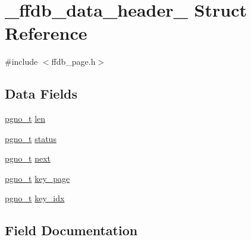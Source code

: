 \hypertarget{struct__ffdb__data__header__}{}\section{\+\_\+ffdb\+\_\+data\+\_\+header\+\_\+ Struct Reference}
\label{struct__ffdb__data__header__}


{\ttfamily \#include $<$ffdb\+\_\+page.\+h$>$}

\subsection*{Data Fields}
\begin{DoxyCompactItemize}
\item 
\mbox{\hyperlink{adat-devel_2other__libs_2filedb_2filehash_2ffdb__db_8h_a000813331643d38481142bcce7de1501}{pgno\+\_\+t}} \mbox{\hyperlink{struct__ffdb__data__header___ae92f78b964c32a66a889e0f8926f39e9}{len}}
\item 
\mbox{\hyperlink{adat-devel_2other__libs_2filedb_2filehash_2ffdb__db_8h_a000813331643d38481142bcce7de1501}{pgno\+\_\+t}} \mbox{\hyperlink{struct__ffdb__data__header___a4c2b44b141df921e83933b19b1fd4e44}{status}}
\item 
\mbox{\hyperlink{adat-devel_2other__libs_2filedb_2filehash_2ffdb__db_8h_a000813331643d38481142bcce7de1501}{pgno\+\_\+t}} \mbox{\hyperlink{struct__ffdb__data__header___a6eec9d909ab0bdaa5d2290d815f9f90e}{next}}
\item 
\mbox{\hyperlink{adat-devel_2other__libs_2filedb_2filehash_2ffdb__db_8h_a000813331643d38481142bcce7de1501}{pgno\+\_\+t}} \mbox{\hyperlink{struct__ffdb__data__header___a91aed66c809924649b60df3bc202f082}{key\+\_\+page}}
\item 
\mbox{\hyperlink{adat-devel_2other__libs_2filedb_2filehash_2ffdb__db_8h_a000813331643d38481142bcce7de1501}{pgno\+\_\+t}} \mbox{\hyperlink{struct__ffdb__data__header___a758886b1c2b9be81b4b08f3265571036}{key\+\_\+idx}}
\end{DoxyCompactItemize}


\subsection{Field Documentation}
\mbox{\label{struct__ffdb__data__header___a758886b1c2b9be81b4b08f3265571036}} 
